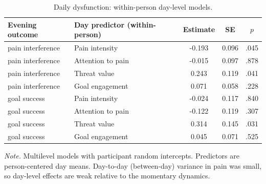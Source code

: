 \begin{table}[H]
\raggedright
\caption{Daily dysfunction: within-person day-level models.}
\label{tab:sup-dysfunction}
\footnotesize
\begingroup
\setlength{\tabcolsep}{4pt}
\renewcommand{\arraystretch}{1.08}
\noindent
\begin{tabular*}{\textwidth}{@{\extracolsep{\fill}}llccc@{}}
\toprule
Evening outcome & Day predictor (within-person) & Estimate & SE & $p$ \\
\midrule
pain interference & Pain intensity & -0.193 & 0.096 & .045 \\
pain interference & Attention to pain & -0.015 & 0.097 & .878 \\
pain interference & Threat value & 0.243 & 0.119 & .041 \\
pain interference & Goal engagement & 0.071 & 0.058 & .228 \\
goal success & Pain intensity & -0.024 & 0.117 & .840 \\
goal success & Attention to pain & -0.122 & 0.119 & .307 \\
goal success & Threat value & 0.314 & 0.145 & .031 \\
goal success & Goal engagement & 0.045 & 0.071 & .525 \\
\bottomrule
\end{tabular*}
\par\vspace{3pt}\noindent\parbox{\textwidth}{\footnotesize\textit{Note.} Multilevel models with participant random intercepts. Predictors are person-centered day means. Day-to-day (between-day) variance in pain was small, so day-level effects are weak relative to the momentary dynamics.}
\endgroup
\end{table}
